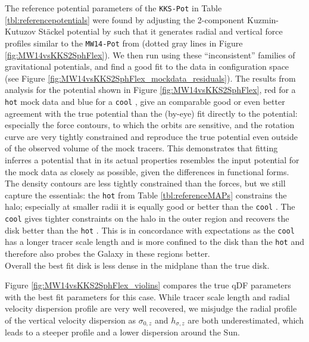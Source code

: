 The reference potential parameters  of the \texttt{KKS-Pot} in Table \ref{tbl:referencepotentials} were found by adjusting the 2-component Kuzmin-Kutuzov St\"{a}ckel potential by \citet{bat94} such that it generates radial and vertical force profiles similar to the \texttt{MW14-Pot} from \citet{bov15} (dotted gray lines in Figure \ref{fig:MW14vsKKS2SphFlex}). We then run \RM{} using these ``inconsistent'' families of gravitational potentials, and find a good fit to the data in configuration space (see Figure \ref{fig:MW14vsKKS2SphFlex_mockdata_residuals}). The results from \RM{} analysis for the potential shown in Figure \ref{fig:MW14vsKKS2SphFlex}, red for a \texttt{hot} mock data \MAP{} and blue for a \texttt{cool} \MAP{}, give an comparable good or even better agreement with the true potential than the (by-eye) fit directly to the potential: especially the force contours, to which the orbits are sensitive, and the rotation curve are very tightly constrained and reproduce the true potential even outside of the observed volume of the mock tracers. This demonstrates that \RM{} fitting inferres a potential that in its actual properties resembles the input potential for the mock data as closely as possible, given the differences in functional forms.
\\The density contours are less tightly constrained than the forces, but we still capture the essentials: the \texttt{hot} \MAP{} from Table \ref{tbl:referenceMAPs} constrains the halo; especially at smaller radii it is equally good or better than the \texttt{cool} \MAP{}. The \texttt{cool} \MAP{} gives tighter constraints on the halo in the outer region and recovers the disk better than the \texttt{hot} \MAP{}. This is in concordance with expectations as the \texttt{cool} \MAP{} has a longer tracer scale length and is more confined to the disk than the \texttt{hot} \MAP{} and therefore also probes the Galaxy in these regions better.
\\Overall the best fit disk is less dense in the midplane than the true disk. 


Figure \ref{fig:MW14vsKKS2SphFlex_violins} compares the true qDF parameters with the best fit parameters for this case. While tracer scale length and radial velocity dispersion profile are very well recovered, we misjudge the radial profile of the vertical velocity dispersion as $\sigma_{0,z}$ and $h_{\sigma,z}$ are both underestimated, which leads to a steeper profile and a lower dispersion around the Sun.






